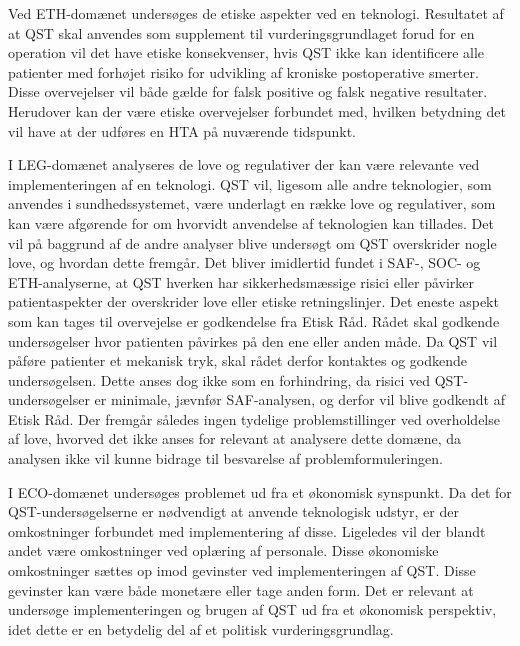 Ved ETH-domænet undersøges de etiske aspekter ved en teknologi. Resultatet af at QST skal anvendes som supplement til vurderingsgrundlaget forud for en operation vil det have etiske konsekvenser, hvis QST ikke kan identificere alle patienter med forhøjet risiko for udvikling af kroniske postoperative smerter. Disse overvejelser vil både gælde for falsk positive og falsk negative resultater. Herudover kan der være etiske overvejelser forbundet med, hvilken betydning det vil have at der udføres en HTA på nuværende tidspunkt.         

I LEG-domænet analyseres de love og regulativer der kan være relevante ved implementeringen af en teknologi. QST vil, ligesom alle andre teknologier, som anvendes i sundhedssystemet, være underlagt en række love og regulativer, som kan være afgørende for om hvorvidt anvendelse af teknologien kan tillades. Det vil på baggrund af de andre analyser blive undersøgt om QST overskrider nogle love, og hvordan dette fremgår. 
Det bliver imidlertid fundet i SAF-, SOC- og ETH-analyserne, at QST hverken har sikkerhedsmæssige risici eller påvirker patientaspekter der overskrider love eller etiske retningslinjer. Det eneste aspekt som kan tages til overvejelse er godkendelse fra Etisk Råd. Rådet skal godkende undersøgelser hvor patienten påvirkes på den ene eller anden måde. Da QST vil påføre patienter et mekanisk tryk, skal rådet derfor kontaktes og godkende undersøgelsen. Dette anses dog ikke som en forhindring, da risici ved QST-undersøgelser er minimale, jævnfør SAF-analysen, og derfor vil blive godkendt af Etisk Råd. 
Der fremgår således ingen tydelige problemstillinger ved overholdelse af love, hvorved det ikke anses for relevant at analysere dette domæne, da analysen ikke vil kunne bidrage til besvarelse af problemformuleringen.

I ECO-domænet undersøges problemet ud fra et økonomisk synspunkt. Da det for QST-undersøgelserne er nødvendigt at anvende teknologisk udstyr, er der omkostninger forbundet med implementering af disse. Ligeledes vil der blandt andet være omkostninger ved oplæring af personale. Disse økonomiske omkostninger sættes op imod gevinster ved implementeringen af QST. Disse gevinster kan være både monetære eller tage anden form. Det er relevant at undersøge implementeringen og brugen af QST ud fra et økonomisk perspektiv, idet dette er en betydelig del af et politisk vurderingsgrundlag. 

